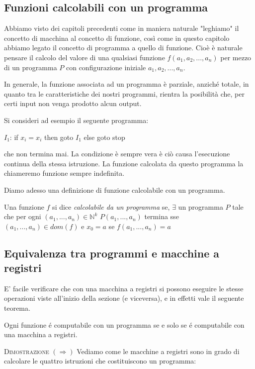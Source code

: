 \subsection{Funzioni calcolabili con un programma}

Abbiamo visto dei capitoli precedenti come in maniera naturale "leghiamo" il
concetto di macchina al concetto di funzione, così come in questo 
capitolo abbiamo legato il concetto di programma a quello di funzione.
Cioè è naturale pensare il calcolo del valore di una qualsiasi funzione $f(a_1, a_2, ... , a_n)$ 
per mezzo di un programma $P$ con configurazione iniziale $a_1, a_2, ... , a_n$.

In generale, la funzione associata ad un programma è parziale, anziché totale, in quanto tra le caratteristiche dei nostri programmi, rientra la
posibilità che, per certi input non venga prodotto alcun output.

Si consideri ad esempio il seguente programma:
	
\begin{mylisting}
$I_1$: if $x_i = x_i $ then goto $I_1$ else goto stop
\end{mylisting}	

che non termina mai. La condizione è sempre vera è ciò causa l'esecuzione
continua della stessa istruzione. La funzione calcolata
da questo programma la chiameremo funzione sempre indefinita.

Diamo adesso una definizione di funzione calcolabile con un programma.

\begin{programmi}
Una funzione $f$ si dice \emph{calcolabile da un programma} se,
$\exists$ un programma $P$ tale che per ogni $(a_1,...,a_n) \in \mathbb{N}^k$ 
$P(a_1,...,a_n)$ termina sse $(a_1,...,a_n) \in dom(f) $ e  $x_0=a$ se 
$f(a_1,...,a_n) = a$
\end{programmi}

\subsection{Equivalenza tra programmi e macchine a registri}

E' facile verificare che con una macchina a registri si possono
eseguire le stesse operazioni viste all'inizio della sezione (e
viceversa), e in effetti vale il seguente teorema.
\begin{progabaco}
Ogni funzione \'e computabile con un programma se e solo se \'e
computabile con una macchina a registri.
\end{progabaco}
\textsc{Dimostrazione} $(\Rightarrow)$ Vediamo come le macchine a
registri sono in grado di calcolare le quattro istruzioni che
costituiscono un programma:\\

